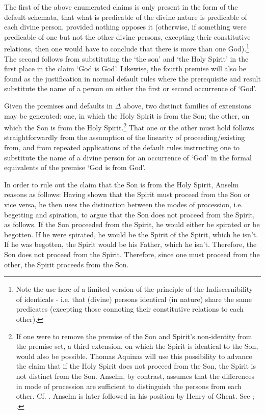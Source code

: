 \documentclass[]{article}
\begin{document}
The first of the above enumerated claims is only present in the form of the default schemata, that what is predicable of the divine nature is predicable of each divine person, provided nothing opposes it (otherwise, if something were predicable of one but not the other divine persons, excepting their constitutive relations, then one would have to conclude that there is more than one God).\footnote{Note the use here of a limited version of the principle of the Indiscernibility of identicals - i.e. that (divine) persons identical (in nature) share the same predicates (excepting those connoting their constitutive relations to each other).} The second follows from substituting the `the son' and `the Holy Spirit' in the first place in the claim `God is God'. Likewise, the fourth premise will also be found as the justification in normal default rules where the prerequisite and result substitute the name of a person on either the first or second occurrence of `God'. 

Given the premises and defaults in $\Delta$ above, two distinct families of extensions may be generated: one, in which the Holy Spirit is from the Son; the other, on which the Son is from the Holy Spirit.\footnote{If one were to remove the premise of the Son and Spirit's non-identity from the premise set, a third extension, on which the Spirit is identical to the Son, would also be possible. Thomas Aquinas will use this possibility to advance the claim that if the Holy Spirit does not proceed from the Son, the Spirit is not distinct from the Son. Anselm, by contrast, assumes that the differences in mode of procession are sufficient to distinguish the persons from each other. Cf. \autocite[Bk. I, d. 11, q. 1, a. 2]{AquinasSent}. Anselm is later followed in his position by Henry of Ghent. See \cite[V, q. 9]{HenryQuod}; \cite{Martin2004}.} That one or the other must hold follows straightforwardly from the assumption of the linearity of proceeding/existing from, and from repeated applications of the default rules instructing one to substitute the name of a divine person for an occurrence of `God' in the formal equivalents of the premise `God is from God'. 

In order to rule out the claim that the Son is from the Holy Spirit, Anselm reasons as follows: Having shown that the Spirit must proceed from the Son or vice versa, he then uses the distinction between the modes of procession, i.e. begetting and spiration, to argue that the Son does not proceed from the Spirit, as follows. If the Son proceeded from the Spirit, he would either be spirated or be begotten. If he were spirated, he would be the Spirit of the Spirit, which he isn't. If he was begotten, the Spirit would be his Father, which he isn't. Therefore, the Son does not proceed from the Spirit. Therefore, since one must proceed from the other, the Spirit proceeds from the Son.
\end{document}
